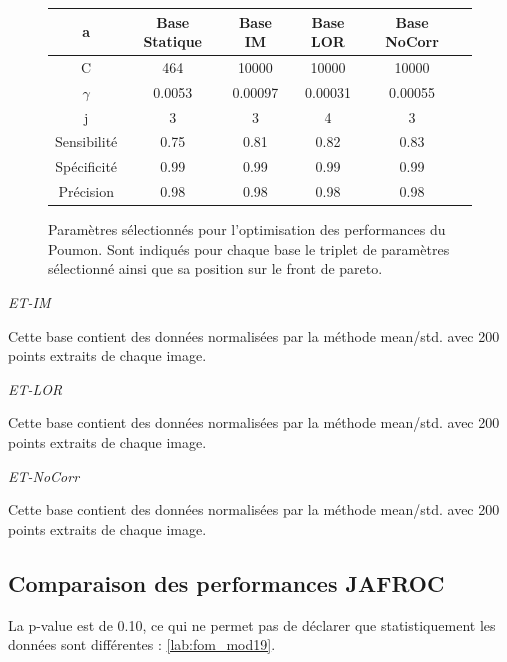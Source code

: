 \begin{figure}[h!]
\label{fig:paramsModPoumon}
		\begin{tabular}{c| c c c c c}
  \hline
  a	& Base Statique	& Base IM	& Base LOR	& Base NoCorr	\\
  \hline
 C 	& 464		& 10000		& 10000		& 10000		\\
\hline
$\gamma$& 0.0053	& 0.00097	& 0.00031	& 0.00055	\\
\hline
j	& 3		& 3		& 4		& 3		\\
\hline
\hline
Sensibilité& 0.75	& 0.81		& 0.82		& 0.83	\\
\hline
Spécificité& 0.99	& 0.99		& 0.99		& 0.99		\\
\hline
Précision& 0.98		& 0.98		& 0.98		& 0.98		\\
\hline
 		\end{tabular}

\caption{Paramètres sélectionnés pour l'optimisation des performances du Poumon. Sont indiqués pour chaque base le triplet de paramètres sélectionné ainsi que sa position sur le front de pareto.}
\end{figure}



\emph{ET-IM}

Cette base contient des données normalisées par la méthode mean/std. avec 200 points extraits de chaque image.




\emph{ET-LOR}

Cette base contient des données normalisées par la méthode mean/std. avec 200 points extraits de chaque image.


\emph{ET-NoCorr}

Cette base contient des données normalisées par la méthode mean/std. avec 200 points extraits de chaque image.


\subsection{Comparaison des performances JAFROC}

La p-value est de 0.10, ce qui ne permet pas de déclarer que statistiquement les données sont différentes : \ref{lab:fom_mod19}.


